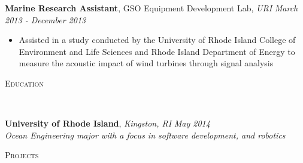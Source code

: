 \documentclass[10pt]{article}
\newenvironment{changemargin}[2]{%
  \begin{list}{}{%
    \setlength{\topsep}{0pt}%
    \setlength{\leftmargin}{#1}%
    \setlength{\rightmargin}{#2}%
    \setlength{\listparindent}{\parindent}%
    \setlength{\itemindent}{\parindent}%
    \setlength{\parsep}{\parskip}%
  }%
  \item[]}{\end{list}
}
\newcommand{\lineover}{
	\begin{changemargin}{-0.05in}{-0.05in}
		\vspace*{-8pt}
		\hrulefill \\
		\vspace*{-2pt}
	\end{changemargin}
}
\newcommand{\header}[1]{
	\begin{changemargin}{-0.5in}{-0.5in}
		\scshape{#1}\\
  	\lineover
	\end{changemargin}
}
\newenvironment{body} {
	\vspace*{-16pt}
	\begin{changemargin}{-0.25in}{-0.5in}
  }
	{\end{changemargin}
}
\begin{document}
\begin{body}
	\textbf{Marine Research Assistant}, GSO Equipment Development Lab, \textit{URI} \hfill \emph{March 2013 - December 2013}\\
	\vspace*{-4pt}
	\begin{itemize} \itemsep -0pt
		\item Assisted in a study conducted by the University of Rhode Island College of Environment and Life Sciences and Rhode Island Department of Energy to measure the acoustic impact of wind turbines through signal analysis
	\end{itemize}
\end{body}
 
\smallskip
 
\header{Education}
 
\begin{body}
	\vspace{14pt}
	\textbf{University of Rhode Island}, \textit{Kingston, RI} \hfill \emph{May 2014} \\
	\emph{Ocean Engineering major with a focus in software development, and robotics}
\end{body}
 
\smallskip
 
 
\header{Projects}
 
\end{document}
